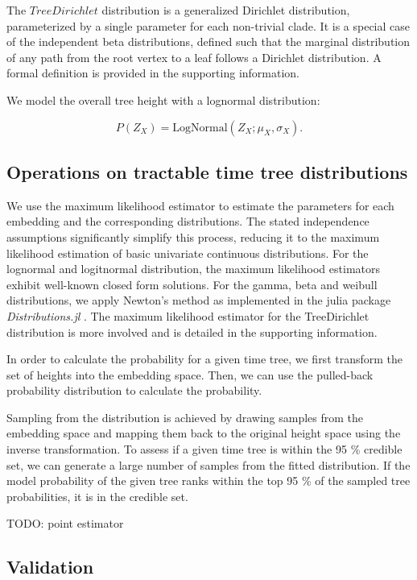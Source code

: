 \documentclass[10pt,letterpaper]{article}
\begin{document}
The $TreeDirichlet$ distribution is a generalized Dirichlet distribution, parameterized by a single parameter for each non-trivial clade. It is a special case of the independent beta distributions, defined such that the marginal distribution of any path from the root vertex to a leaf follows a Dirichlet distribution. A formal definition is provided in the supporting information.

We model the overall tree height with a lognormal distribution:

$$
P(Z_X) = \text{LogNormal}(Z_X; \mu_X, \sigma_X).
$$

\subsection*{Operations on tractable time tree distributions}

We use the maximum likelihood estimator to estimate the parameters for each embedding and the corresponding distributions. The stated independence assumptions significantly simplify this process, reducing it to the maximum likelihood estimation of basic univariate continuous distributions. For the lognormal and logitnormal distribution, the maximum likelihood estimators exhibit well-known closed form solutions. For the gamma, beta and weibull distributions, we apply Newton's method as implemented in the julia package \emph{Distributions.jl} \cite{Distributions.jl}. The maximum likelihood estimator for the TreeDirichlet distribution is more involved and is detailed in the supporting information.

In order to calculate the probability for a given time tree, we first transform the set of heights into the embedding space. Then, we can use the pulled-back probability distribution to calculate the probability.

Sampling from the distribution is achieved by drawing samples from the embedding space and mapping them back to the original height space using the inverse transformation. To assess if a given time tree is within the 95 \% credible set, we can generate a large number of samples from the fitted distribution. If the model probability of the given tree ranks within the top 95 \% of the sampled tree probabilities, it is in the credible set.

TODO: point estimator

\subsection*{Validation}
\end{document}
